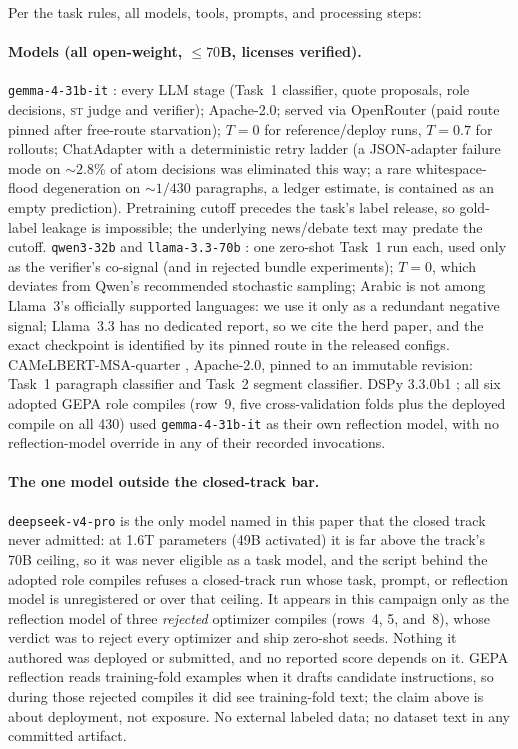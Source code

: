 \documentclass[11pt]{article}
\newcommand{\lab}[1]{\textsc{#1}}
\newcommand{\st}{\lab{st}}
\begin{document}
Per the task rules, all models, tools, prompts, and processing steps:

\paragraph{Models (all open-weight, ${\leq}70$B, licenses verified).}
\texttt{gemma-4-31b-it} \citep{gemmateam-2026-gemma4}: every LLM stage
(Task~1 classifier, quote proposals, role decisions, \st{} judge and
verifier);
Apache-2.0; served via OpenRouter (paid route pinned after free-route
starvation); $T{=}0$ for reference/deploy runs, $T{=}0.7$ for rollouts;
ChatAdapter with a deterministic retry ladder (a JSON-adapter failure
mode on ${\sim}2.8\%$ of atom decisions was eliminated this way; a rare
whitespace-flood degeneration on ${\sim}1/430$ paragraphs, a ledger
estimate, is contained as an empty prediction). Pretraining cutoff precedes the task's label
release, so gold-label leakage is impossible; the underlying news/debate
text may predate the cutoff. \texttt{qwen3-32b}
\citep{qwenteam-2025-qwen3} and \texttt{llama-3.3-70b}
\citep{llamateam-2024-llama3}: one zero-shot Task~1 run each, used only
as the verifier's co-signal (and in rejected bundle experiments);
$T{=}0$, which deviates from Qwen's recommended stochastic sampling;
Arabic is not among Llama~3's officially supported languages: we use it
only as a redundant negative signal; Llama~3.3 has no dedicated report,
so we cite the herd paper, and the exact checkpoint is identified by its
pinned route in the released configs. CAMeLBERT-MSA-quarter
\citep{inoue-etal-2021-camelbert}, Apache-2.0, pinned to an immutable
revision: Task~1 paragraph classifier and Task~2 segment classifier.
DSPy 3.3.0b1 \citep{khattab-etal-2024-dspy}; all six adopted GEPA role
compiles (row~9, five cross-validation folds plus the deployed compile on
all 430) used \texttt{gemma-4-31b-it} as their own reflection model, with
no reflection-model override in any of their recorded invocations.

\paragraph{The one model outside the closed-track bar.}
\texttt{deepseek-v4-pro} \citep{deepseekai-2026-deepseekv4} is the only
model named in this paper that the closed track never admitted: at 1.6T
parameters (49B activated) it is far above the track's 70B ceiling, so it
was never eligible as a task model, and the script behind the adopted
role compiles refuses a closed-track run whose task, prompt, or
reflection model is unregistered or over that ceiling. It appears in this campaign only as the
reflection model of three \emph{rejected} optimizer compiles (rows~4, 5,
and~8), whose verdict was to reject every optimizer and ship zero-shot
seeds. Nothing it authored was deployed or submitted, and no reported
score depends on it. GEPA reflection reads training-fold examples when
it drafts candidate instructions, so during those rejected compiles it
did see training-fold text; the claim above is about deployment, not
exposure. No external labeled data; no dataset text in any committed
artifact.
\end{document}
